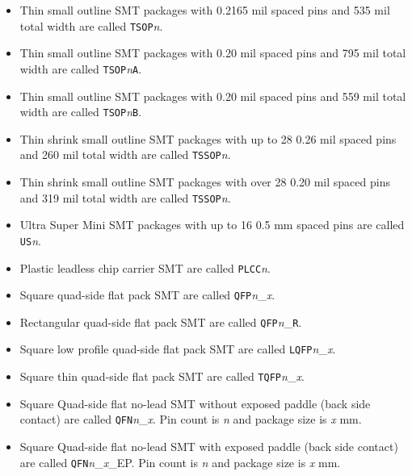 \documentclass{article}
\begin{document}
\begin{itemize}
\item   Thin small outline SMT packages with 0.2165 mil spaced pins and
	535 mil total width are called {\tt TSOP}{\it n}.

\item   Thin small outline SMT packages with 0.20 mil spaced pins and
	795 mil total width are called {\tt TSOP}{\it n}{\tt A}.

\item   Thin small outline SMT packages with 0.20 mil spaced pins and
	559 mil total width are called {\tt TSOP}{\it n}{\tt B}.

\item   Thin shrink small outline SMT packages with up to 28 0.26 mil
	spaced pins and 260 mil total width are called {\tt TSSOP}{\it n}.

\item   Thin shrink small outline SMT packages with over 28 0.20 mil
	spaced pins and 319 mil total width are called {\tt TSSOP}{\it n}.

\item   Ultra Super Mini SMT packages with up to 16 0.5 mm spaced pins
	are called {\tt US}{\it n}.

\item   Plastic leadless chip carrier SMT are called {\tt PLCC}{\it n}.

\item   Square quad-side flat pack SMT are called 
        {\tt QFP}{\it n}\_{\it x}.

\item   Rectangular quad-side flat pack SMT are called 
        {\tt QFP}{\it n}\_{\tt R}.

\item   Square low profile quad-side flat pack SMT are called 
        {\tt LQFP}{\it n}\_{\it x}.

\item   Square thin quad-side flat pack SMT are called 
        {\tt TQFP}{\it n}\_{\it x}.

\item   Square Quad-side flat no-lead SMT without exposed
	paddle (back side contact) are called
        {\tt QFN}{\it n}\_{\it x}.  Pin count is {\it n} and
	package size is {\it x} mm.

\item   Square Quad-side flat no-lead SMT with exposed
	paddle (back side contact) are called
        {\tt QFN}{\it n}\_{\it x}\_EP.  Pin count is {\it n} and
	package size is {\it x} mm.


\end{itemize}
\end{document}
